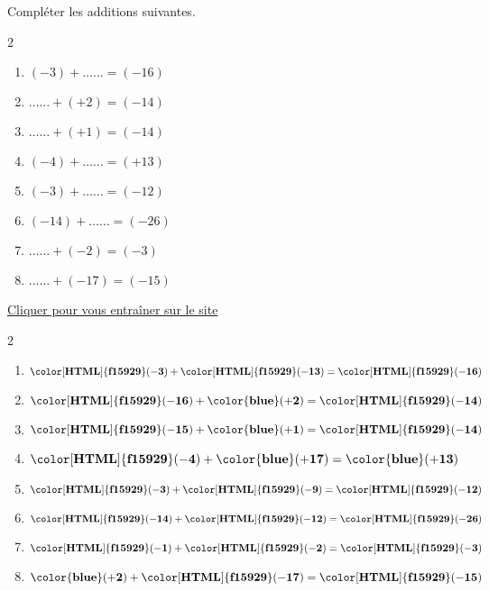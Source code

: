 \begin{exercice*}
    Compléter les additions suivantes.
    \begin{multicols}2
        \begin{enumerate}            
            \item $ (-3) + \ldots\ldots = (-16) $
            \item $ \ldots\ldots + (+2) = (-14) $
            \item $ \ldots\ldots + (+1) = (-14) $
            \item $ (-4) + \ldots\ldots = (+13) $
            \item $ (-3) + \ldots\ldots = (-12) $
            \item $ (-14) + \ldots\ldots = (-26) $
            \item $ \ldots\ldots + (-2) = (-3) $
            \item $ \ldots\ldots + (-17) = (-15) $          
        \end{enumerate}
    \end{multicols}

    \href{https://coopmaths.fr/mathalea.html?ex=5R20-2,s=20,s2=false,n=10,i=1&v=l&z=1}{Cliquer pour vous entraîner sur le site \mathaleaLogo} 
\end{exercice*}
\begin{corrige}
    \phantom{rrr}    
    \begin{multicols}2
        \begin{enumerate}
            \item $ \mathbf{{\color[HTML]{f15929}(-3)}} + \mathbf{{\color[HTML]{f15929}(-13)}} = \mathbf{{\color[HTML]{f15929}(-16)}} $
            \item $ \mathbf{{\color[HTML]{f15929}(-16)}} + \mathbf{{\color{blue}(+2)}} = \mathbf{{\color[HTML]{f15929}(-14)}} $
            \item $ \mathbf{{\color[HTML]{f15929}(-15)}} + \mathbf{{\color{blue}(+1)}} = \mathbf{{\color[HTML]{f15929}(-14)}} $
            \item $ \mathbf{{\color[HTML]{f15929}(-4)}} + \mathbf{{\color{blue}(+17)}} = \mathbf{{\color{blue}(+13)}} $
            \item $ \mathbf{{\color[HTML]{f15929}(-3)}} + \mathbf{{\color[HTML]{f15929}(-9)}} = \mathbf{{\color[HTML]{f15929}(-12)}} $
            \item $ \mathbf{{\color[HTML]{f15929}(-14)}} + \mathbf{{\color[HTML]{f15929}(-12)}} = \mathbf{{\color[HTML]{f15929}(-26)}} $
            \item $ \mathbf{{\color[HTML]{f15929}(-1)}} + \mathbf{{\color[HTML]{f15929}(-2)}} = \mathbf{{\color[HTML]{f15929}(-3)}} $
            \item $ \mathbf{{\color{blue}(+2)}} + \mathbf{{\color[HTML]{f15929}(-17)}} = \mathbf{{\color[HTML]{f15929}(-15)}} $
        \end{enumerate}   
    \end{multicols}
\end{corrige}